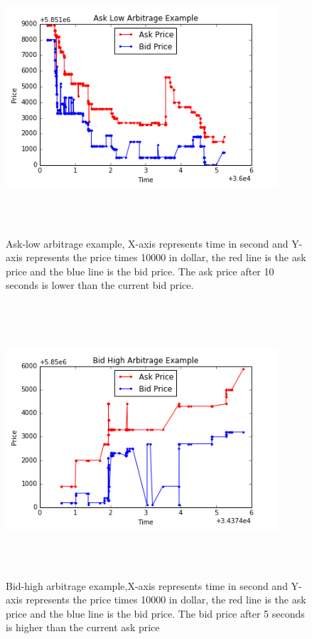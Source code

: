 \begin{figure} [hp]
  \begin{center}
    \includegraphics[width=4in,  height=4in]{figures/ask_low_example.png}
  \end{center}
\caption{Ask-low arbitrage example, X-axis represents time in second and Y-axis represents the price times 10000 in dollar, the red line is the ask price and the blue line is the bid price. The ask price after 10 seconds is lower than the current bid price.} \label{fig:ask_low}
\end{figure}


\begin{figure} [hp]
  \begin{center}
    \includegraphics[width=4in,  height=4in]{figures/bid_high_example.png}
  \end{center}
\caption{Bid-high arbitrage example,X-axis represents time in second and Y-axis represents the price times 10000 in dollar, the red line is the ask price and the blue line is the bid price. The bid price after 5 seconds is higher than the current ask price} \label{fig:bid_high}
\end{figure}



